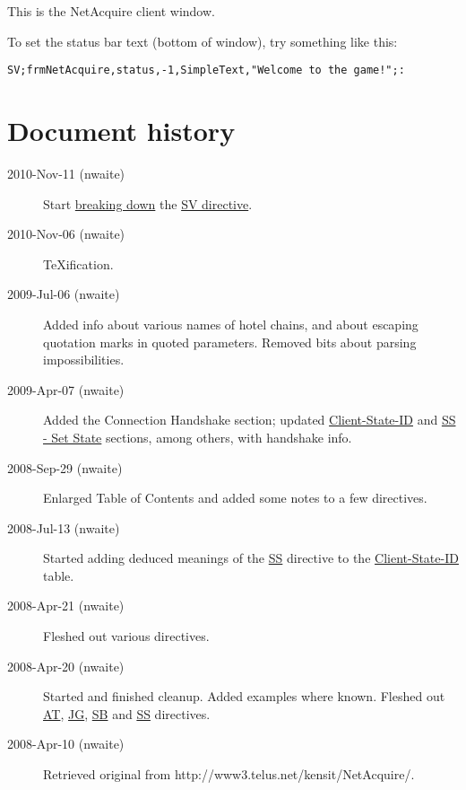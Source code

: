 \documentclass{article}
\providecommand{\wiredata}[1]{\texttt{{#1}}}
\begin{document}
This is the NetAcquire client window.

To set the status bar text (bottom of window), try something like this:

\wiredata{SV;frmNetAcquire,status,-1,SimpleText,"Welcome to the game!";:}



\section{Document history} %
\label{sec:document_history}

\begin{description}
  \item[2010-Nov-11 (nwaite)] Start \hyperref[sec:set_value_breakdown]{breaking down} the \hyperref[ssub:sv_set_value]{SV directive}.
  \item[2010-Nov-06 (nwaite)] {\TeX}ification.
  \item[2009-Jul-06 (nwaite)] Added info about various names of hotel chains, and about escaping quotation marks in quoted parameters. Removed bits about parsing impossibilities.
  \item[2009-Apr-07 (nwaite)] Added the Connection Handshake section; updated \hyperref[ssub:client_state_id]{Client-State-ID} and \hyperref[ssub:ss_set_state]{SS - Set State} sections, among others, with handshake info.
  \item[2008-Sep-29 (nwaite)] Enlarged Table of Contents and added some notes to a few directives.
  \item[2008-Jul-13 (nwaite)] Started adding deduced meanings of the \hyperref[ssub:ss_set_state]{SS} directive to the \hyperref[ssub:client_state_id]{Client-State-ID} table.
  \item[2008-Apr-21 (nwaite)] Fleshed out various directives.
  \item[2008-Apr-20 (nwaite)] Started and finished cleanup. Added examples where known. Fleshed out \hyperref[ssub:at_activate_tile]{AT}, \hyperref[ssub:jg_join_game]{JG}, \hyperref[ssub:sb_set_board_status]{SB} and \hyperref[ssub:ss_set_state]{SS} directives.
  \item[2008-Apr-10 (nwaite)] Retrieved original from http://www3.telus.net/kensit/NetAcquire/.
\end{description}

\end{document}
